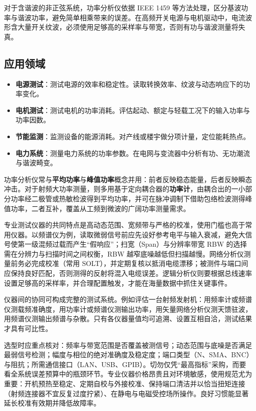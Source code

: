 对于含谐波的非正弦系统，功率分析仪依据 IEEE 1459 等方法处理，区分基波功率与谐波功率，避免简单相乘带来的误差。在高频开关电源与电机驱动中，电流波形含大量开关纹波，必须使用足够高的采样率与带宽，否则有功与谐波测量将失真。

\subsection{应用领域}

\begin{itemize}
    \item \textbf{电源测试}：测试电源的效率和稳定性。读取转换效率、纹波与动态响应下的功率变化。
    \item \textbf{电机测试}：测试电机的功率消耗。评估起动、额定与轻载工况下的输入功率与功率因数。
    \item \textbf{节能监测}：监测设备的能源消耗。对产线或楼宇做分项计量，定位能耗热点。
    \item \textbf{电力系统}：测量电力系统的功率参数。在电网与变流器中分析有功、无功潮流与谐波畸变。
\end{itemize}

功率分析仪常与\textbf{平均功率}与\textbf{峰值功率}概念并用：前者反映稳态能量，后者反映瞬态冲击。对于射频大功率测量，则多用基于定向耦合器的\textbf{功率计}，由耦合出的一小部分功率经二极管或热敏检波得到平均功率，并可在脉冲调制下借助包络检波测得峰值功率，二者互补，覆盖从工频到微波的广阔功率测量需求。

专业测试仪器的共同特点是高动态范围、宽频带与严格的校准，使用门槛也高于常用仪器。以频谱仪为例，读取微弱信号前应先设好参考电平与输入衰减，避免大信号使第一级混频过载而产生“假响应”；扫宽（Span）与分辨率带宽 RBW 的选择需在分辨力与扫描时间之间权衡，RBW 越窄底噪越低但扫描越慢。网络分析仪测量前务必完成校准（常用 SOLT），并定期复核以抵消电缆漂移；被测件与端口间应保持良好匹配，否则测得的反射将混入电缆误差。逻辑分析仪则要根据总线速率设置足够高的采样率，并合理配置触发，才能在海量数据中抓住关键事件。

仪器间的协同可构成完整的测试系统。例如评估一台射频发射机：用频率计或频谱仪测载频准确度，用功率计或频谱仪测输出功率，用矢量网络分析仪测天馈驻波，用频谱仪测输出频谱与杂散。只有各仪器量值均可追溯、设置互相自洽，测试结果才具有可比性。

选型时应重点核对：频率与带宽范围是否覆盖被测信号；动态范围与底噪是否满足最弱信号检测；幅度与相位的绝对准确度及稳定度；端口类型（N、SMA、BNC）与阻抗；所需通信接口（LAN、USB、GPIB）。切勿仅凭“最高指标”采购，而要看全系统误差预算中的瓶颈环节。专业仪器价格昂贵且对环境敏感，使用规范尤为重要：开机预热至稳定、定期自校与外接校准、保持端口清洁并以恰当扭矩连接（射频连接器不宜反复过度拧紧）、在静电与电磁受控场所操作。良好习惯能显著延长校准有效期并降低故障率。

